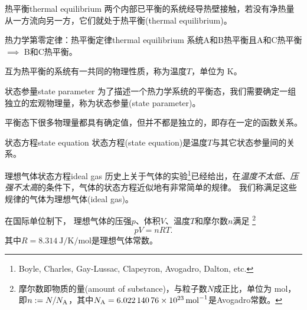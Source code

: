 \begin{definition}
	{热平衡}{thermal equilibrium}
	两个内部已平衡的系统经导热壁接触，若没有净热量从一方流向另一方，它们就处于热平衡(thermal equilibrium)。
\end{definition}

\begin{theorem}{热力学第零定律：热平衡定律}{thermal equilibrium}
	系统A和B热平衡且A和C热平衡$\implies$ B和C热平衡。
\end{theorem}

\begin{corollary}
	互为热平衡的系统有一共同的物理性质，称为温度$T$，单位为 \unit{K}。
\end{corollary}

\begin{definition}
	{状态参量}{state parameter}
	为了描述一个热力学系统的平衡态，我们需要确定一组独立的宏观物理量，称为状态参量(state parameter)。
\end{definition}


\begin{remark}
	平衡态下很多物理量都具有确定值，但并不都是独立的，即存在一定的函数关系。
\end{remark}

\begin{definition}{状态方程}{state equation}
	状态方程(state equation)是温度$T$与其它状态参量间的关系。
\end{definition}

\begin{example}
	{理想气体状态方程}{ideal gas}
	历史上关于气体的实验\footnote{Boyle, Charles, Gay-Lussac, Clapeyron, Avogadro, Dalton, etc.}已经给出，在\textit{温度不太低、压强不太高}的条件下，气体的状态方程近似地有非常简单的规律。
	我们称满足这些规律的气体为理想气体(ideal gas)。

	在国际单位制下，
	理想气体的压强$p$、体积$V$、温度$T$和摩尔数$n$满足
	\footnote{摩尔数即物质的量(amount of substance)，与粒子数$N$成正比，单位为 \unit{mol}，即$n := N/N_{\mathrm{A}}$，其中$N_{\mathrm{A}} = \qty{6.02214076e23}{\per\mole}$是Avogadro常数。}
	\begin{equation}
		\label{eqn:pV=nRT}
		pV = nRT.
	\end{equation}
	其中$R = \qty{8.314}{\joule\per\kelvin\per\mole}$是理想气体常数。
\end{example}

